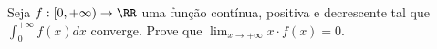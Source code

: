 Seja $ f : [0, +\infty) \to \RR$ uma função contínua, positiva e decrescente tal que $\int_0^{+\infty} f(x)dx$ converge. Prove que $\lim_{x\to+\infty} x\cdot f(x) = 0$.